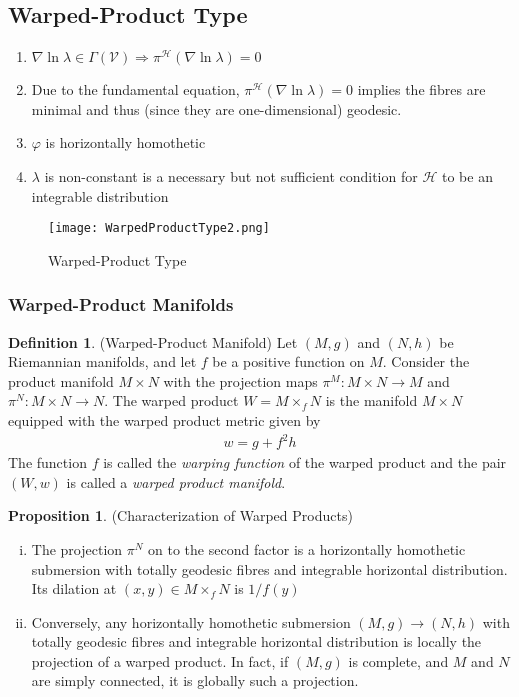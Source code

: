 \documentclass[12pt]{article}
\theoremstyle{definition}
\newtheorem{definition}{Definition}[section]
\newtheorem{proposition}{Proposition}[subsection]
\numberwithin{equation}{subsection}
\begin{document}
\subsection{Warped-Product Type}\label{sec:WPtype}
\begin{enumerate}
    \item $\nabla \ln \lambda \in \Gamma\left(\mathcal{V} \right) \Rightarrow \pi^\mathcal{H}(\nabla \ln \lambda) = 0 $
    \item Due to the fundamental equation, $\pi^\mathcal{H}(\nabla \ln \lambda) = 0$ implies the fibres are minimal and thus (since they are one-dimensional) geodesic. 
    \item  $\varphi$ is horizontally homothetic
    \item $\lambda$ is non-constant is a necessary but not sufficient condition for $\mathcal{H}$ to be an integrable distribution 
\end{enumerate}
    \begin{figure}[H]
    \centering
    \texttt{[image: WarpedProductType2.png]}
    \caption{Warped-Product Type}
    \label{fig:Warped-Product}
\end{figure}

\subsubsection{Warped-Product Manifolds}

\begin{definition}
(Warped-Product Manifold) Let $(M, g)$ and $(N,h)$ be Riemannian manifolds, and let $f$ be a positive function on $M$. Consider the product manifold $M\times N$ with the projection maps $\pi^M: M \times N \rightarrow M$ and $\pi^N: M \times N \rightarrow N$. The warped product $W = M\times _{f}N$ is the manifold $M \times N$ equipped with the warped product metric given by
\begin{align}
    w = g + f^2 h
\end{align}
The function $f$ is called the \textit{warping function} of the warped product and the pair $(W,w)$ is called a \textit{warped product manifold}. 
\end{definition}

\begin{proposition}
(Characterization of Warped Products) \begin{enumerate}[(i)]
    \item The projection $\pi^N$ on to the second factor is a horizontally homothetic submersion with totally geodesic fibres and integrable horizontal distribution. Its dilation at $(x,y) \in M \times_{f} N$ is $1/f(y)$\\
    \item Conversely, any horizontally homothetic submersion $(M,g) \rightarrow (N,h)$ with totally geodesic fibres and integrable horizontal distribution is locally the projection of a warped product. In fact, if $(M,g)$ is complete, and $M$ and $N$ are simply connected, it is globally such a projection.
\end{enumerate}
\end{proposition}
\end{document}
